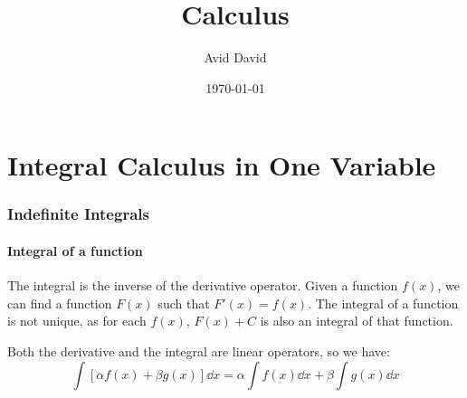 \documentclass[12pt]{article}
\begin{document}
\title{Calculus}
\author{Avid David}
\date{\today}
\maketitle
\tableofcontents
\newpage
\part{Integral Calculus in One Variable}
\section{Indefinite Integrals}
\subsection{Integral of a function}
The integral is the inverse of the derivative operator. Given a function $f(x)$, we can find a function $F(x)$ such that $F'(x) = f(x)$. The integral of a function is not unique, as for each $f(x)$, $F(x) + C$ is also an integral of that function.
\begin{concept}
    Both the derivative and the integral are linear operators, so we have:
    \begin{equation*}
        \int [\alpha f(x) + \beta g(x) ]\dd x = \alpha \int f(x)\dd x + \beta \int g(x) \dd x
    \end{equation*}
\end{concept}
\end{document}
